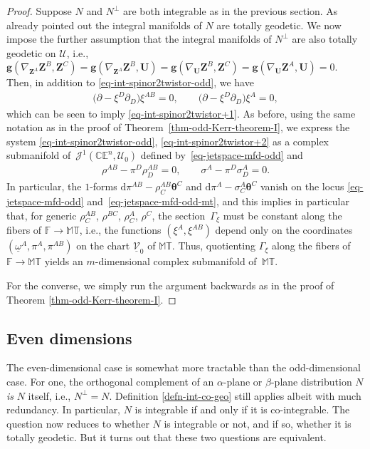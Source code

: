 \documentclass[10pt,a4paper]{amsart}
\numberwithin{equation}{section}
\newcommand{\mc} [1]{\mathcal{#1}}
\newcommand{\dd} {\mathrm{d}}
\newcommand{\T} {\mathbb{T}}
\newcommand{\E} {\mathbb{E}}
\newcommand{\M} {\mathbb{M}}
\newcommand{\C} {\mathbb{C}}
\newcommand{\F} {\mathbb{F}}
\begin{document}
\begin{proof}Suppose $N$ and $N^\perp$ are both integrable as in the previous section. As already pointed out the integral manifolds of $N$ are totally geodetic. We now impose the further assumption that the integral manifolds of $N^\perp$ are also totally geodetic on $\mc{U}$, i.e., $\bm{g} ( \nabla_{\bm{Z}^{A}} \bm{Z}^{B} , \bm{Z}^{C} ) = \bm{g} ( \nabla_{\bm{Z}^{A}} \bm{Z}^{B} , \bm{U} ) = \bm{g} ( \nabla_{\bm{U}} \bm{Z}^{B} , \bm{Z}^{C} ) = \bm{g} ( \nabla_{\bm{U}} \bm{Z}^{A} , \bm{U} ) = 0$. Then, in addition to \eqref{eq-int-spinor2twistor-odd}, we have
\begin{gather}\label{eq-int-spinor2twistor+2}
\big( \partial - \xi^{D} \partial _{D} \big) \xi^{AB} = 0 , \qquad \big( \partial - \xi^{D} \partial _{D} \big) \xi^{A} = 0 ,
\end{gather}
which can be seen to imply \eqref{eq-int-spinor2twistor+1}. As before, using the same notation as in the proof of Theorem~\ref{thm-odd-Kerr-theorem-I}, we express the system \eqref{eq-int-spinor2twistor-odd}, \eqref{eq-int-spinor2twistor+2} as a complex submanifold of~$\mc{J}^1(\C\E^n,\mc{U}_0)$ def\/ined by~\eqref{eq-jetspace-mfd-odd} and
\begin{gather}\label{eq-jetspace-mfd-odd-mt}
\rho^{AB} - \pi^{D} \rho_D^{AB} = 0 , \qquad \sigma^{A} - \pi^{D} \sigma _{D}^{A} = 0 .
\end{gather}
In particular, the $1$-forms $\dd \pi^{AB} - \rho_{C}^{AB} \bm{\theta}^C$ and $\dd \pi^{A} - \sigma_{C}^{A} \bm{\theta}^C$ vanish on the locus \eqref{eq-jetspace-mfd-odd} and~\eqref{eq-jetspace-mfd-odd-mt}, and this implies in particular that, for generic $\rho_{C}^{AB}$, $\rho^{BC}$, $\rho_{C}^{A}$, $\rho^{C}$, the section~$\Gamma_\xi$ must be constant along the f\/ibers of $\F \rightarrow \M\T$, i.e., the functions $(\xi^A,\xi^{AB})$ depend only on the coordinates $(\underline{\omega}^A,\pi^A,\pi^{AB})$ on the chart $\underline{\mc{V}}_0$ of $\M\T$. Thus, quotienting $\Gamma_\xi$ along the f\/ibers of $\F \rightarrow \M\T$ yields an $m$-dimensional complex submanifold of~$\M\T$.

For the converse, we simply run the argument backwards as in the proof of Theorem \ref{thm-odd-Kerr-theorem-I}.
\end{proof}

\subsection{Even dimensions}
The even-dimensional case is somewhat more tractable than the odd-dimensional case. For one, the orthogonal complement of an $\alpha$-plane or $\beta$-plane distribution $N$ \emph{is} $N$ itself, i.e., $N^\perp = N$. Def\/inition \ref{defn-int-co-geo} still applies albeit with much redundancy. In particular, $N$ is integrable if and only if it is co-integrable. The question now reduces to whether $N$ is integrable or not, and if so, whether it is totally geodetic. But it turns out that these two questions are equivalent.
\end{document}
